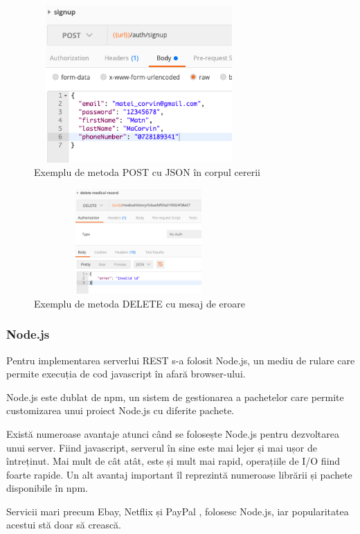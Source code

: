 \documentclass[12pt]{article}
\begin{document}
\begin{figure}[H]
\centering
\includegraphics[width=8cm, height=6cm]{post.png}
\caption{Exemplu de metoda POST cu JSON în corpul cererii}
\end{figure}
    
\begin{figure}[H]
\centering
\includegraphics[width=8cm, height=4cm]{delete.png}
\caption{Exemplu de metoda DELETE cu mesaj de eroare}
\end{figure}
    
\subsubsection{Node.js}

Pentru implementarea serverlui REST s-a folosit
Node.js, un mediu de rulare care permite execuția de cod
javascript în afară browser-ului.

Node.js este dublat de npm, un sistem de gestionarea a pachetelor
care permite customizarea unui proiect Node.js cu diferite pachete.

Există numeroase avantaje atunci când se folosește Node.js pentru dezvoltarea unui server.
Fiind javascript, serverul în sine este mai lejer și mai ușor de întreținut. Mai mult
de cât atât, este și mult mai rapid, operațiile de I/O fiind foarte rapide.
Un alt avantaj important îl reprezintă numeroase librării și pachete disponibile în npm.

Servicii mari precum Ebay, Netflix și PayPal \cite{tilkov2010node}, folosesc Node.js, iar popularitatea
acestui stă doar să crească.
\end{document}
